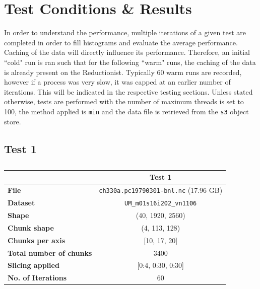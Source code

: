 \documentclass{article}
\begin{document}
\section{Test Conditions \& Results}

In order to understand the performance, multiple iterations of a given test are completed in order to fill histograms and evaluate the average performance. Caching of the data will directly influence its performance. Therefore, an initial ``cold" run is ran such that for the following ``warm" runs, the caching of the data is already present on the Reductionist. Typically 60 warm runs are recorded, however if a process was very slow, it was capped at an earlier number of iterations. This will be indicated in the respective testing sections. Unless stated otherwise, tests are performed with the number of maximum threads is set to 100, the method applied is \texttt{min} and the data file is retrieved from the \texttt{s3} object store.

\subsection{Test 1}
\begin{table}[h!] 
    \centering 
    \begin{tabular}{lc}  \hline
                                        & Test 1                                          \\ \hline
        \textbf{File}                   & \texttt{ch330a.pc19790301-bnl.nc}  (17.96  GB)  \\  
        \textbf{Dataset}                & \texttt{UM\_m01s16i202\_vn1106}                 \\ 
        \textbf{Shape}                  & (40, 1920, 2560)                                \\ 
        \textbf{Chunk shape}            & (4, 113, 128)                                   \\ 
        \textbf{Chunks per axis}        & [10, 17, 20]                                    \\ 
        \textbf{Total number of chunks} & 3400                                            \\ 
        \textbf{Slicing applied}        & [0:4, 0:30, 0:30]                               \\ 
        \textbf{No. of Iterations}      & 60                                              \\  \hline
    \end{tabular} 
    \caption{} 
    \label{tab:T1_Conditions} 
\end{table}
\end{document}
